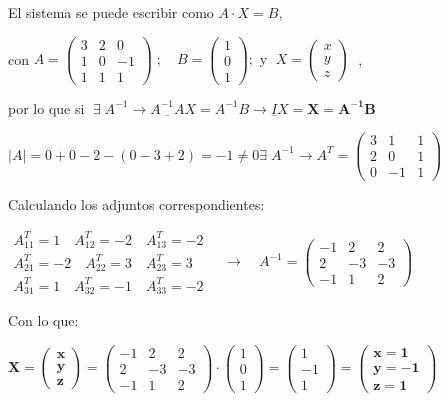 \begin{proofw}\renewcommand{\qedsymbol}{$\diamond$}

El sistema se puede escribir como $A\cdot X=B$, 

con $A= \left( \begin{matrix} 3&2&0\\1&0&-1\\1&1&1  \end{matrix} \right)\; ; \quad B= \left( \begin{matrix} 1\\0\\1 \end{matrix} \right); \text{ y }\; X= \left( \begin{matrix} x\\y\\z \end{matrix} \right)\; $ ,

por lo que si $\;\exists \; A^{-1} \to  \underline{A^{-1}A}X=A^{-1}B \to \underline{I}X=\boldsymbol{ X=A^{-1}B}$

$|A|=0+0-2-(0-3+2)=-1\neq 0 \exists \; A^{-1} \to A^T=\left( \begin{matrix}  3&1&1\\2&0&1\\0&-1&1\end{matrix} \right)$

Calculando los adjuntos correspondientes:

$\begin{matrix}
A^T_{11}=1\quad A^T_{12}=-2\quad A^T_{13}=-2 \\
A^T_{21}=-2\quad A^T_{22}=3\quad A^T_{23}=3 \\
A^T_{31}=1\quad A^T_{32}=-1\quad A^T_{33}=-2 
\end{matrix} \quad \to \quad 
 A^{-1}=  \left( \begin{matrix} -1&2&2\\ 2&-3&-3 \\ -1&1&2 \end{matrix} \right)$ 
 
 Con lo que:
 
 $\boldsymbol {X= \left( \begin{matrix} x\\y\\z \end{matrix} \right)} =
\left( \begin{matrix} -1&2&2\\ 2&-3&-3 \\ -1&1&2 \end{matrix} \right) \cdot
\left( \begin{matrix} 1\\0\\1 \end{matrix} \right) =\left( \begin{matrix} 1\\-1\\1 \end{matrix} \right) =
\boldsymbol{ \left( \begin{matrix} x=1\\ y=-1 \\ z=1 \end{matrix} \right) }$


\end{proofw}
